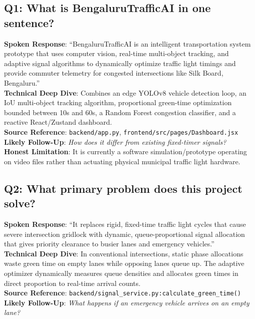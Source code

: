 \subsection*{Q1: What is BengaluruTrafficAI in one sentence?}
\begin{interviewbox}
\textbf{Spoken Response}: ``BengaluruTrafficAI is an intelligent transportation system prototype that uses computer vision, real-time multi-object tracking, and adaptive signal algorithms to dynamically optimize traffic light timings and provide commuter telemetry for congested intersections like Silk Board, Bengaluru.''\\
\textbf{Technical Deep Dive}: Combines an edge YOLOv8 vehicle detection loop, an IoU multi-object tracking algorithm, proportional green-time optimization bounded between 10s and 60s, a Random Forest congestion classifier, and a reactive React/Zustand dashboard.\\
\textbf{Source Reference}: \texttt{backend/app.py}, \texttt{frontend/src/pages/Dashboard.jsx}\\
\textbf{Likely Follow-Up}: \textit{How does it differ from existing fixed-timer signals?}\\
\textbf{Honest Limitation}: It is currently a software simulation/prototype operating on video files rather than actuating physical municipal traffic light hardware.
\end{interviewbox}

\subsection*{Q2: What primary problem does this project solve?}
\begin{interviewbox}
\textbf{Spoken Response}: ``It replaces rigid, fixed-time traffic light cycles that cause severe intersection gridlock with dynamic, queue-proportional signal allocation that gives priority clearance to busier lanes and emergency vehicles.''\\
\textbf{Technical Deep Dive}: In conventional intersections, static phase allocations waste green time on empty lanes while opposing lanes queue up. The adaptive optimizer dynamically measures queue densities and allocates green times in direct proportion to real-time arrival counts.\\
\textbf{Source Reference}: \texttt{backend/signal\_service.py:calculate\_green\_time()}\\
\textbf{Likely Follow-Up}: \textit{What happens if an emergency vehicle arrives on an empty lane?}
\end{interviewbox}

